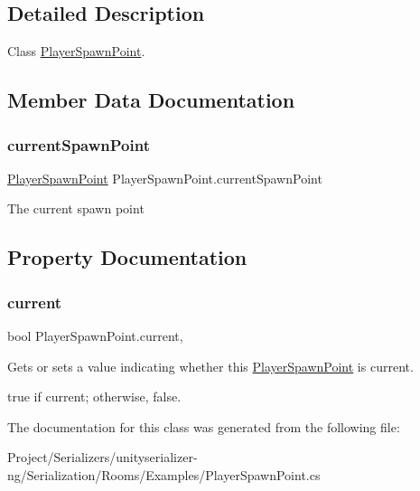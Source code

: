 \subsection{Detailed Description}
Class \hyperlink{class_player_spawn_point}{Player\+Spawn\+Point}. 



\subsection{Member Data Documentation}
\mbox{\label{class_player_spawn_point_acb5190cac21b1663f0cd6e2c18ec379d}} 
\subsubsection{\texorpdfstring{current\+Spawn\+Point}{currentSpawnPoint}}
{\footnotesize\ttfamily \hyperlink{class_player_spawn_point}{Player\+Spawn\+Point} Player\+Spawn\+Point.\+current\+Spawn\+Point\hspace{0.3cm}{\ttfamily [static]}}



The current spawn point 



\subsection{Property Documentation}
\mbox{\label{class_player_spawn_point_ae5c1307f57aef3291b3190541bb0c0cf}} 
\subsubsection{\texorpdfstring{current}{current}}
{\footnotesize\ttfamily bool Player\+Spawn\+Point.\+current\hspace{0.3cm}{\ttfamily [get]}, {\ttfamily [set]}}



Gets or sets a value indicating whether this \hyperlink{class_player_spawn_point}{Player\+Spawn\+Point} is current. 

{\ttfamily true} if current; otherwise, {\ttfamily false}.

The documentation for this class was generated from the following file\+:\begin{DoxyCompactItemize}
\item 
Project/\+Serializers/unityserializer-\/ng/\+Serialization/\+Rooms/\+Examples/Player\+Spawn\+Point.\+cs\end{DoxyCompactItemize}
